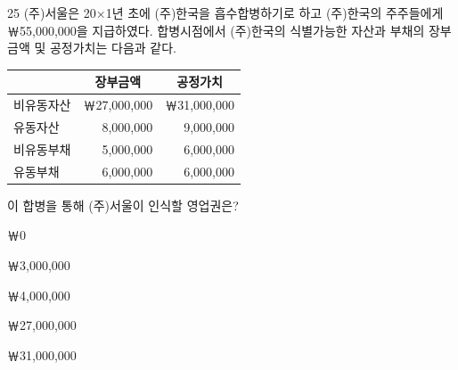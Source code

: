 \begin{question}{25}
(주)서울은 20×1년 초에 (주)한국을 흡수합병하기로 하고 (주)한국의 주주들에게 ￦55,000,000을 지급하였다. 합병시점에서 (주)한국의 식별가능한 자산과 부채의 장부금액 및 공정가치는 다음과 같다.

{\small\centering
\begin{tabular}{|l|r|r|}
\hline
 & \multicolumn{1}{c|}{장부금액} & \multicolumn{1}{c|}{공정가치} \\
\hline
비유동자산 & ￦27,000,000 & ￦31,000,000 \\
유동자산 & 8,000,000 & 9,000,000 \\
비유동부채 & 5,000,000 & 6,000,000 \\
유동부채 & 6,000,000 & 6,000,000 \\
\hline
\end{tabular}\par}

이 합병을 통해 (주)서울이 인식할 영업권은? \par
\begin{choices}
  \item ￦0
  \item ￦3,000,000
  \item ￦4,000,000
  \item ￦27,000,000
  \item ￦31,000,000
\end{choices}
\end{question}
